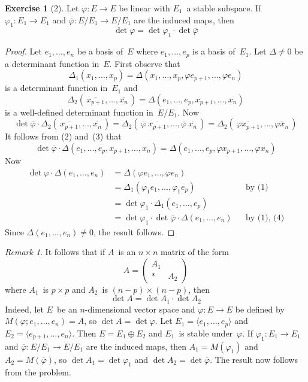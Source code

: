 \documentclass[letterpaper,12pt]{article}
\newcommand{\dsum}{\oplus}
\newcommand{\mult}{\cdot}
\newcommand{\gen}[1]{\langle#1\rangle}
\newcommand{\proj}[1]{\overline{#1}}
\theoremstyle{definition}
\newtheorem*{exer}{Exercise}
\theoremstyle{remark}
\newtheorem*{rmk}{Remark}
\begin{document}
\begin{exer}[2]
Let \(\varphi:E\to E\) be linear with \(E_1\)~a stable subspace. If \(\varphi_1:E_1\to E_1\) and \(\proj{\varphi}:E/E_1\to E/E_1\) are the induced maps, then
\[\det\varphi=\det\varphi_1\mult\det\proj{\varphi}\]
\end{exer}
\begin{proof}
Let \(e_1,\ldots,e_n\) be a basis of~\(E\) where \(e_1,\ldots,e_p\) is a basis of~\(E_1\). Let \(\Delta\ne 0\) be a determinant function in~\(E\). First observe that
\[\Delta_1(x_1,\ldots,x_p)=\Delta(x_1,\ldots,x_p,\varphi e_{p+1},\ldots,\varphi e_n)\tag{1}\]
is a determinant function in~\(E_1\) and
\[\Delta_2(\,\proj{x_{p+1}},\ldots,\proj{x_n}\,)=\Delta(e_1,\ldots,e_p,x_{p+1},\ldots,x_n)\tag{2}\]
is a well-defined determinant function in~\(E/E_1\). Now
\[\det\proj{\varphi}\mult\Delta_2(\,\proj{x_{p+1}},\ldots,\proj{x_n}\,)=\Delta_2(\,\proj{\varphi}\ \proj{x_{p+1}},\ldots,\proj{\varphi}\ \proj{x_n}\,)=\Delta_2(\,\proj{\varphi x_{p+1}},\ldots,\proj{\varphi x_n}\,)\tag{3}\]
It follows from (2) and~(3) that
\[\det\proj{\varphi}\mult\Delta(e_1,\ldots,e_p,x_{p+1},\ldots,x_n)=\Delta(e_1,\ldots,e_p,\varphi x_{p+1},\ldots,\varphi x_n)\tag{4}\]
Now
\begin{align*}
\det\varphi\mult\Delta(e_1,\ldots,e_n)&=\Delta(\varphi e_1,\ldots,\varphi e_n)&&\\
	&=\Delta_1(\varphi_1 e_1,\ldots,\varphi_1 e_p)&&\text{by~(1)}\\
	&=\det\varphi_1\mult\Delta_1(e_1,\ldots,e_p)&&\\
	&=\det\varphi_1\mult\det\proj{\varphi}\mult\Delta(e_1,\ldots,e_n)&&\text{by (1), (4)}
\end{align*}
Since \(\Delta(e_1,\ldots,e_n)\ne 0\), the result follows.
\end{proof}
\begin{rmk}
It follows that if \(A\)~is an \(n\times n\) matrix of the form
\[A=\begin{pmatrix}
A_1&\\
*&A_2
\end{pmatrix}\]
where \(A_1\)~is \(p\times p\) and \(A_2\)~is \((n-p)\times(n-p)\), then
\[\det A=\det A_1\mult\det A_2\]
Indeed, let \(E\)~be an \(n\)-dimensional vector space and \(\varphi:E\to E\) be defined by \(M(\varphi;e_1,\ldots,e_n)=A\), so \(\det A=\det\varphi\). Let \(E_1=\gen{e_1,\ldots,e_p}\) and \(E_2=\gen{e_{p+1},\ldots,e_n}\). Then \(E=E_1\dsum E_2\) and \(E_1\)~is stable under~\(\varphi\). If \(\varphi_1:E_1\to E_1\) and \(\proj{\varphi}:E/E_1\to E/E_1\) are the induced maps, then \(A_1=M(\varphi_1)\) and \(A_2=M(\proj{\varphi})\), so \(\det A_1=\det\varphi_1\) and \(\det A_2=\det\proj{\varphi}\). The result now follows from the problem.
\end{rmk}
\end{document}
